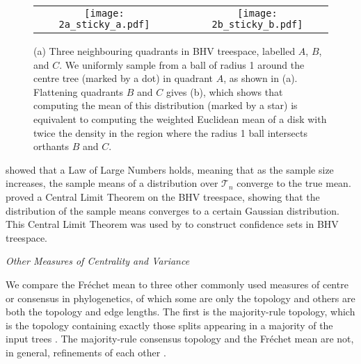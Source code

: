 \documentclass[12pt,letterpaper]{article}
\theoremstyle{plain}
\theoremstyle{definition}
\newcommand\cT{\mathcal{T}}
\renewcommand{\subsection}[1]{%
\bigskip
\begin{center}
\begin{large}
\normalfont\itshape #1
\end{large}
\end{center}}
\begin{document}
\begin{figure}[htb]
	\centering
	\begin{tabular}{ccc}
	\texttt{[image: 2a\_sticky\_a.pdf]}&&   
	\texttt{[image: 2b\_sticky\_b.pdf]}
	\end{tabular}
    \caption{(a) Three neighbouring quadrants in BHV treespace, labelled $A$, $B$, and $C$.  We uniformly sample from a ball of radius 1 around the centre tree (marked by a dot) in quadrant $A$, as shown in (a).  Flattening quadrants $B$ and $C$ gives (b), which shows that computing the mean of this distribution (marked by a star) is equivalent to computing the weighted Euclidean mean of a disk with twice the density in the region where the radius 1 ball intersects orthants $B$ and $C$.}  
    	\label{fig:sticky}
\end{figure}

\citet{Sturm03} showed that a Law of Large Numbers holds, meaning that as the sample size increases, the sample means of a distribution over $\cT_n$ converge to the true mean.  \citet{CLTcomplete} proved a Central Limit Theorem on the BHV treespace, showing that the distribution of the sample means converges to a certain Gaussian distribution.  This Central Limit Theorem was used by \citet{willisConfidence} to construct confidence sets in BHV treespace.




\subsection{Other Measures of Centrality and Variance} 

We compare the Fr\'echet mean to three other commonly used measures of centre or consensus in phylogenetics, of which some are only the topology and others are both the topology and edge lengths.  The first is the majority-rule topology, which is the topology containing exactly those splits appearing in a majority of the input trees \citep{majority-rule}. The majority-rule consensus topology and the Fr\'echet mean are not, in general, refinements of each other \citep{MillerOwenProvan2015}.
\end{document}

